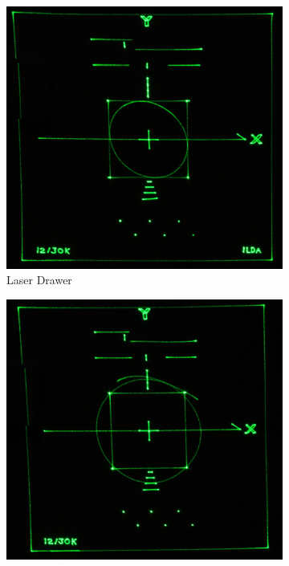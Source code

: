 \begin{figure}[ht]
	\begin{bigcenter}
        \begin{subfigure}[b]{0.5\textwidth}
                \includegraphics[width=\textwidth]{images/comp/custom_proj_10k.jpg}
                \caption{Laser Drawer}
                \label{fig:proj_test_custom}
        \end{subfigure}
        \begin{subfigure}[b]{0.5\textwidth}
                \includegraphics[width=\textwidth]{images/comp/galaxy_proj_10k.jpg}

\end{subfigure}
\end{bigcenter}
\end{figure}
